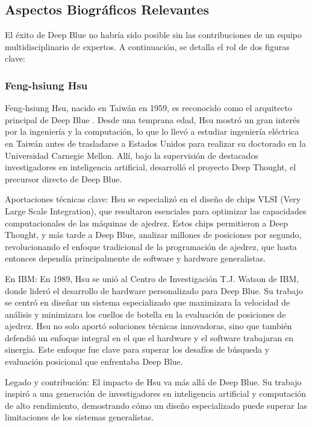 \documentclass[12pt,a4paper]{article}
\begin{document}
\subsection{Aspectos Biográficos Relevantes}
El éxito de Deep Blue no habría sido posible sin las contribuciones de un equipo multidisciplinario de expertos. A continuación, se detalla el rol de dos figuras clave:

\subsubsection*{Feng-hsiung Hsu}
Feng-hsiung Hsu, nacido en Taiwán en 1959, es reconocido como el arquitecto principal de Deep Blue \cite{hsu2002deep}. Desde una temprana edad, Hsu mostró un gran interés por la ingeniería y la computación, lo que lo llevó a estudiar ingeniería eléctrica en Taiwán antes de trasladarse a Estados Unidos para realizar su doctorado en la Universidad Carnegie Mellon. Allí, bajo la supervisión de destacados investigadores en inteligencia artificial, desarrolló el proyecto Deep Thought, el precursor directo de Deep Blue.

Aportaciones técnicas clave:
Hsu se especializó en el diseño de chips VLSI (Very Large Scale Integration), que resultaron esenciales para optimizar las capacidades computacionales de las máquinas de ajedrez. Estos chips permitieron a Deep Thought, y más tarde a Deep Blue, analizar millones de posiciones por segundo, revolucionando el enfoque tradicional de la programación de ajedrez, que hasta entonces dependía principalmente de software y hardware generalistas.

En IBM:
En 1989, Hsu se unió al Centro de Investigación T.J. Watson de IBM, donde lideró el desarrollo de hardware personalizado para Deep Blue. Su trabajo se centró en diseñar un sistema especializado que maximizara la velocidad de análisis y minimizara los cuellos de botella en la evaluación de posiciones de ajedrez.
Hsu no solo aportó soluciones técnicas innovadoras, sino que también defendió un enfoque integral en el que el hardware y el software trabajaran en sinergia. Este enfoque fue clave para superar los desafíos de búsqueda y evaluación posicional que enfrentaba Deep Blue.

Legado y contribución:
El impacto de Hsu va más allá de Deep Blue. Su trabajo inspiró a una generación de investigadores en inteligencia artificial y computación de alto rendimiento, demostrando cómo un diseño especializado puede superar las limitaciones de los sistemas generalistas.
\end{document}
